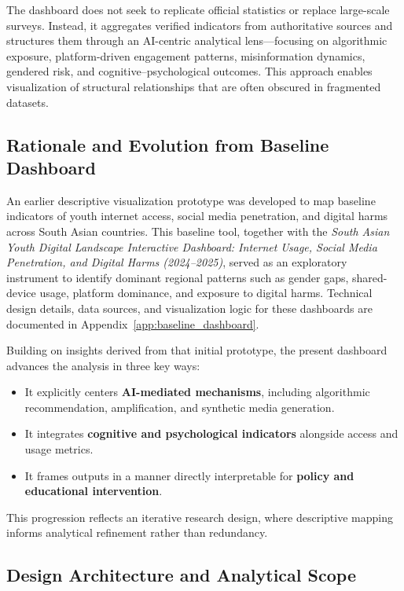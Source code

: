 \documentclass[12pt,a4paper]{report}
\begin{document}
The dashboard does not seek to replicate official statistics or replace large-scale surveys. Instead, it aggregates verified indicators from authoritative sources and structures them through an AI-centric analytical lens—focusing on algorithmic exposure, platform-driven engagement patterns, misinformation dynamics, gendered risk, and cognitive–psychological outcomes. This approach enables visualization of structural relationships that are often obscured in fragmented datasets.

\subsection{Rationale and Evolution from Baseline Dashboard}

An earlier descriptive visualization prototype was developed to map baseline indicators of youth internet access, social media penetration, and digital harms across South Asian countries. This baseline tool, together with the \textit{South Asian Youth Digital Landscape Interactive Dashboard: Internet Usage, Social Media Penetration, and Digital Harms (2024--2025)}, served as an exploratory instrument to identify dominant regional patterns such as gender gaps, shared-device usage, platform dominance, and exposure to digital harms. Technical design details, data sources, and visualization logic for these dashboards are documented in Appendix~\ref{app:baseline_dashboard}.


Building on insights derived from that initial prototype, the present dashboard advances the analysis in three key ways:

\begin{itemize}
  \item It explicitly centers \textbf{AI-mediated mechanisms}, including algorithmic recommendation, amplification, and synthetic media generation.
  \item It integrates \textbf{cognitive and psychological indicators} alongside access and usage metrics.
  \item It frames outputs in a manner directly interpretable for \textbf{policy and educational intervention}.
\end{itemize}

This progression reflects an iterative research design, where descriptive mapping informs analytical refinement rather than redundancy.

\subsection{Design Architecture and Analytical Scope}
\end{document}
